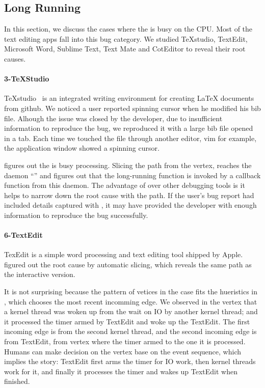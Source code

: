 \subsection{Long Running}

In this section, we discuss the cases where the \spinningnode is busy on the
CPU. Most of the text editing apps fall into this bug category. We studied
TeXstudio, TextEdit, Microsoft Word, Sublime Text, Text Mate and CotEditor to
reveal their root causes.


\paragraph{3-TeXStudio}

TeXstudio~\cite{texstudio} is an integrated writing environment for creating
LaTeX documents from github. We noticed a user reported spinning cursor when he
modified his bib file. Alhough the issue was closed by the developer, due to
insufficient information to reproduce the bug, we reproduced it with a large bib
file opened in a tab. Each time we touched the file through another editor, vim
for example, the application window showed a spinning cursor.

\xxx figures out the \spinningnode is busy processing. Slicing the path from
the vertex, \xxx reaches the daemon ``'' and figures out that the
long-running function is invoked by a callback function from this daemon. The
advantage of \xxx over other debugging tools is it helps to narrow down the root
cause with the path. If the user's bug report had included details captured with
\xxx, it may have provided the developer with enough information to reproduce
the bug successfully.

\paragraph{6-TextEdit}

TexEdit is a simple word processing and text editing tool shipped by Apple. \xxx
figured out the root cause by automatic slicing, which reveals the same path as
the interactive version.

It is not surprising because the pattern of vetices in the case fits the
hueristics in \xxx, which chooses the most recent incomming edge. We observed
in the vertex that a kernel thread was woken up from the wait on IO by another
kernel thread; and it processed the timer armed by TextEdit and woke up the
TextEdit. The first incoming edge is from the second kernel thread, and the
second incoming edge is from TextEdit, from vertex where the timer armed to the
one it is processed. Humans can make decision on the vertex base on the event
sequence, which implies the story: TextEdit first arms the timer for IO work,
then kernel threads work for it, and finally it processes the timer and wakes up
TextEdit when finished.


